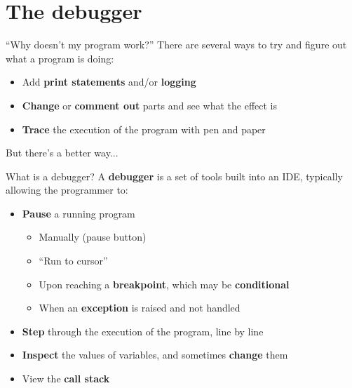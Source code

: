 \part{The debugger}
\frame{\partpage}

\begin{frame}{``Why doesn't my program work?''}
	\pause There are several ways to try and figure out what a program is doing:
	\begin{itemize}
		\pause\item Add \textbf{print statements} and/or \textbf{logging}
		\pause\item \textbf{Change} or \textbf{comment out} parts and see what the effect is
		\pause\item \textbf{Trace} the execution of the program with pen and paper
	\end{itemize}
	\pause But there's a better way...
\end{frame}

\begin{frame}{What is a debugger?}
	\pause A \textbf{debugger} is a set of tools built into an IDE, typically allowing the programmer to:
	\begin{itemize}
		\pause\item \textbf{Pause} a running program
			\begin{itemize}
				\pause\item Manually (pause button)
				\pause\item ``Run to cursor''
				\pause\item Upon reaching a \textbf{breakpoint}, which may be \textbf{conditional}
				\pause\item When an \textbf{exception} is raised and not handled
			\end{itemize}
		\pause\item \textbf{Step} through the execution of the program, line by line
		\pause\item \textbf{Inspect} the values of variables, and sometimes \textbf{change} them
		\pause\item View the \textbf{call stack}
	\end{itemize}
\end{frame}

